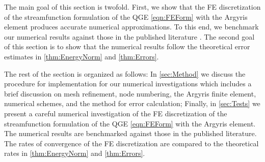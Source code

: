 The main goal of this section is twofold. First, we show that the FE
discretization of the streamfunction formulation of the QGE \eqref{eqn:FEForm}
with the Argyris element produces accurate numerical approximations. To this
end, we benchmark our numerical results against those in the published
literature \cite{Vallis06,Cascon,Myers}. The second goal of this section is to
show that the numerical results follow the theoretical error estimates in
\autoref{thm:EnergyNorm} and \autoref{thm:Errors}.

The rest of the section is organized as follows: In \autoref{sec:Method} we
discuss the procedure for implementation for our numerical investigations which
includes a brief discussion on mesh refinement, node numbering, the Argyris
finite element, numerical schemes, and the method for error calculation;
Finally, in \autoref{sec:Tests} we present a careful numerical investigation of
the FE discretization of the streamfunction formulation of the QGE
\eqref{eqn:FEForm} with the Argyris element. The numerical results are
benchmarked against those in the published literature. The rates of convergence
of the FE discretization are compared to the theoretical rates in
\autoref{thm:EnergyNorm} and \autoref{thm:Errors}.

